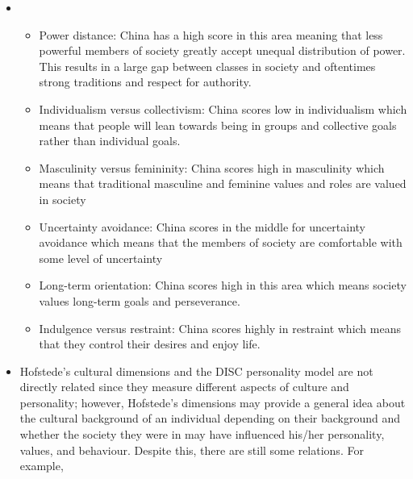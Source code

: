 \documentclass[12pt, letterpaper, titlepage]{article}
\begin{document}
\begin{enumerate}
\begin{itemize}
        \item \begin{itemize}
            \item Power distance: China has a high score in this area meaning that less powerful members of society greatly accept unequal distribution of power. This results in a large gap between classes in society and oftentimes strong traditions and respect for authority.
            \item Individualism versus collectivism: China scores low in individualism which means that people will lean towards being in groups and collective goals rather than individual goals.
            \item Masculinity versus femininity: China scores high in masculinity which means that traditional masculine and feminine values and roles are valued in society 
            \item Uncertainty avoidance: China scores in the middle for uncertainty avoidance which means that the members of society are comfortable with some level of uncertainty
            \item Long-term orientation: China scores high in this area which means society values long-term goals and perseverance.
            \item Indulgence versus restraint: China scores highly in restraint which means that they control their desires and enjoy life.
        \end{itemize}
        \item Hofstede's cultural dimensions and the DISC personality model are not directly related since they measure different aspects of culture and personality; however, Hofstede's dimensions may provide a general idea about the cultural background of an individual depending on their background and whether the society they were in may have influenced his/her personality, values, and behaviour. Despite this, there are still some relations. For example, 
    \end{itemize}
\end{enumerate}
\end{document}
